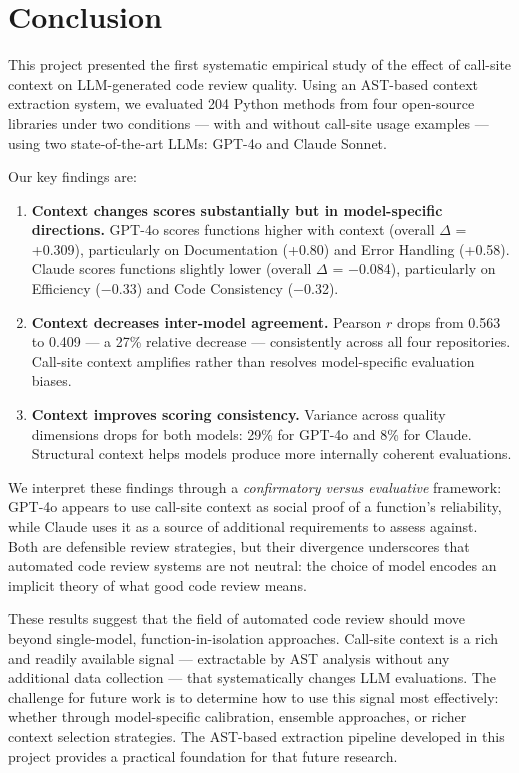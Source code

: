 \documentclass[12pt]{report}
\begin{document}
\section{Conclusion}

This project presented the first systematic empirical study of the effect of call-site context on LLM-generated code review quality. Using an AST-based context extraction system, we evaluated 204 Python methods from four open-source libraries under two conditions --- with and without call-site usage examples --- using two state-of-the-art LLMs: GPT-4o and Claude Sonnet.

Our key findings are:

\begin{enumerate}
    \item \textbf{Context changes scores substantially but in model-specific directions.} GPT-4o scores functions higher with context (overall $\Delta$ = +0.309), particularly on Documentation (+0.80) and Error Handling (+0.58). Claude scores functions slightly lower (overall $\Delta$ = $-$0.084), particularly on Efficiency ($-$0.33) and Code Consistency ($-$0.32).
    \item \textbf{Context decreases inter-model agreement.} Pearson $r$ drops from 0.563 to 0.409 --- a 27\% relative decrease --- consistently across all four repositories. Call-site context amplifies rather than resolves model-specific evaluation biases.
    \item \textbf{Context improves scoring consistency.} Variance across quality dimensions drops for both models: 29\% for GPT-4o and 8\% for Claude. Structural context helps models produce more internally coherent evaluations.
\end{enumerate}

We interpret these findings through a \textit{confirmatory versus evaluative} framework: GPT-4o appears to use call-site context as social proof of a function's reliability, while Claude uses it as a source of additional requirements to assess against. Both are defensible review strategies, but their divergence underscores that automated code review systems are not neutral: the choice of model encodes an implicit theory of what good code review means.

These results suggest that the field of automated code review should move beyond single-model, function-in-isolation approaches. Call-site context is a rich and readily available signal --- extractable by AST analysis without any additional data collection --- that systematically changes LLM evaluations. The challenge for future work is to determine how to use this signal most effectively: whether through model-specific calibration, ensemble approaches, or richer context selection strategies. The AST-based extraction pipeline developed in this project provides a practical foundation for that future research.
\end{document}
